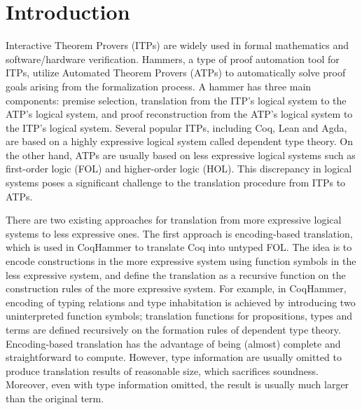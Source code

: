 \section{Introduction}

  Interactive Theorem Provers (ITPs) are widely used in formal mathematics and
  software/hardware verification. Hammers, a type of proof automation tool for
  ITPs, utilize Automated Theorem Provers (ATPs) to automatically solve proof goals
  arising from the formalization process. A hammer has three main components:
  premise selection, translation from the ITP's logical system to the ATP's
  logical system, and proof reconstruction from the ATP's logical system to
  the ITP's logical system. Several popular ITPs, including Coq, Lean and Agda,
  are based on a highly expressive logical system called dependent type theory.
  On the other hand, ATPs are usually based on less expressive logical systems such
  as first-order logic (FOL) and higher-order logic (HOL). This discrepancy in
  logical systems poses a significant challenge to the translation procedure from
  ITPs to ATPs.

  \noindent There are two existing approaches for translation from more expressive
  logical systems to less expressive ones. The first approach is encoding-based translation,
  which is used in CoqHammer to translate Coq into untyped FOL. The idea is to encode
  constructions in the more expressive system using function symbols in the less
  expressive system, and define the translation as a recursive function on the construction
  rules of the more expressive system. For example, in CoqHammer, encoding of typing relations
  and type inhabitation is achieved by introducing two uninterpreted function symbols;
  translation functions for propositions, types and terms are defined recursively on
  the formation rules of dependent type theory. Encoding-based translation has the advantage of
  being (almost) complete and straightforward to compute. However, type information are
  usually omitted to produce translation results of reasonable size, which sacrifices soundness.
  Moreover, even with type information omitted, the result is usually much larger
  than the original term.

